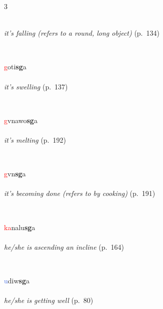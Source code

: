 \documentclass[oneside,openany]{book}%
\begin{document}
\begin{multicols}{3}
\begin{minipage}[t]{\linewidth}
\\
\noindent \textit{it's falling (refers to a round, long object)} (p.~134)
\end{minipage}\\[1em]%
\begin{minipage}[t]{\linewidth}
\raggedright\noindent \textcolor{Red}{g}oti\textbf{sg}a\\
\\
\noindent \textit{it's swelling} (p.~137)
\end{minipage}\\[1em]%
\begin{minipage}[t]{\linewidth}
\raggedright\noindent \textcolor{Red}{g}vnawo\textbf{sg}a\\
\\
\noindent \textit{it's melting} (p.~192)
\end{minipage}\\[1em]%
\begin{minipage}[t]{\linewidth}
\raggedright\noindent \textcolor{Red}{g}vn\textbf{sg}a\\
\\
\noindent \textit{it's becoming done (refers to by cooking)} (p.~191)
\end{minipage}\\[1em]%
\begin{minipage}[t]{\linewidth}
\raggedright\noindent \textcolor{Red}{ka}nalu\textbf{sg}a\\
\\
\noindent \textit{he/she is ascending an incline} (p.~164)
\end{minipage}\\[1em]%
\begin{minipage}[t]{\linewidth}
\raggedright\noindent \textcolor{RoyalBlue}{u}diw\textbf{sg}a\\
\\
\noindent \textit{he/she is getting well} (p.~80)
\end{minipage}\\[1em]%

\end{multicols}
\end{document}
